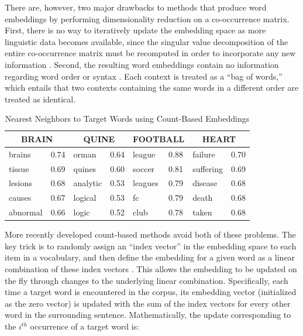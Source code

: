 There are, however, two major drawbacks to methods that produce word embeddings by performing dimensionality reduction on a co-occurrence matrix. First, there is no way to iteratively update the embedding space as more linguistic data becomes available, since the singular value decomposition of the entire co-occurrence matrix must be recomputed in order to incorporate any new information \citep{Sahlgren:2005}. Second, the resulting word embeddings contain no information regarding word order or syntax \citep{JonesMewhort:2007}. Each context is treated as a ``bag of words,'' which entails that two contexts containing the same words in a different order are treated as identical. 

\begin{table}[!t]
\begin{center} 
\caption{Nearest Neighbors to Target Words using Count-Based Embeddings} 

\label{tab:nearestneighbors} 
\vskip 0.06in

\setlength{\tabcolsep}{13pt}
\begin{tabular}{llllllll} 
\hline

\multicolumn{2}{c}{\rule{0pt}{3ex} BRAIN} & 
\multicolumn{2}{c}{QUINE} & 
\multicolumn{2}{c}{FOOTBALL} & 
\multicolumn{2}{c}{HEART} \\
\hline
\rule{0pt}{3ex}brains & 0.74 & orman & 0.64 & league & 0.88 &
failure & 0.70  \\
tissue & 0.69 & quines & 0.60 & soccer & 0.81 &
suffering & 0.69  \\
lesions & 0.68 & analytic & 0.53 & leagues & 0.79 &
disease & 0.68  \\
causes & 0.67 & logical & 0.53 & fc & 0.79 &
death & 0.68  \\
abnormal & 0.66 & logic & 0.52 & club & 0.78 &
taken & 0.68  \\
\hline
\end{tabular} 
\end{center} 
\end{table}

More recently developed count-based methods avoid both of these problems. The key trick is to randomly assign an ``index vector'' in the embedding space to each item in a vocabulary, and then define the embedding for a given word as a linear combination of these index vectors \citep{JonesMewhort:2007,Sahlgren:2005,Sahlgren:2008}. This allows the embedding to be updated on the fly through changes to the underlying linear combination. Specifically, each time a target word is encountered in the corpus, its embedding vector (initialized as the zero vector) is updated with the sum of the index vectors for every other word in the surrounding sentence. Mathematically, the update corresponding to the $i^{th}$ occurrence of a target word is: 

